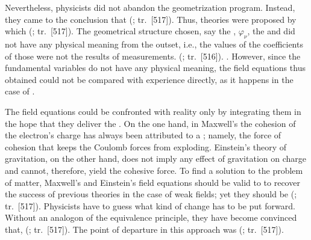 \documentclass[final]{article}
\newcommand{\phin}{\ensuremath{\varphi_\nu}\xspace}
\renewcommand{\rzlap}[2]{(\cite[#1]{Reichenbach1928}; tr.\ [#2])\xspace}
\begin{document}
Nevertheless, physicists did not abandon the geometrization program. Instead, they came to the conclusion that  \rzlap{371}{517}. Thus, theories were proposed by  which  \rzlap{371}{517}. The geometrical structure chosen, say the \Gtmn, \phin, the \Gtmn and \gmn\etc did not have any physical meaning from the outset, i.e., the values of the coefficients of those were not the results of measurements.  \rzlap{369}{516}. . However, since the fundamental variables do not have any physical meaning, the field equations thus obtained could not be compared with experience directly, as it happens in the case of \gr.

The field equations could be confronted with reality only by integrating them in the hope that they deliver the . On the one hand, in Maxwell's \ed the cohesion of the electron's charge has always been attributed to a ; namely, the force of cohesion that keeps the Coulomb forces from exploding. Einstein's theory of gravitation, on the other hand, does not imply any effect of gravitation on charge and cannot, therefore, yield the cohesive force. To find a solution to the problem of matter, Maxwell's and Einstein's field equations should be valid to  to recover the success of previous theories in the case of weak fields; yet they should be  \rzlap{370}{517}. Physicists have to guess what kind of change has to be put forward. Without an analogon of the equivalence principle, they have become convinced that,  \rzlap{371}{517}. The point of departure in this approach was  \rzlap{370}{517}. 
\end{document}
